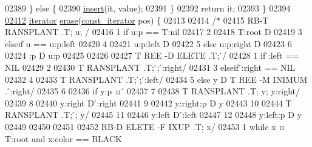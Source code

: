 \begin{DoxyCode}
02389                 \} \textcolor{keywordflow}{else} \{
02390                     \hyperlink{classaed2_1_1iterator_ab9446668ad5619115b6c4a10eac83d68_ab9446668ad5619115b6c4a10eac83d68}{insert}(it, value);
02391                 \}
02392                 \textcolor{keywordflow}{return} it;
02393             \}
02394 
\hyperlink{classaed2_1_1iterator_adf371aaec9e68bd4a4d5a889d0b6b679_adf371aaec9e68bd4a4d5a889d0b6b679}{02412}             \hyperlink{classaed2_1_1iterator_1_1iterator}{iterator} \hyperlink{classaed2_1_1iterator_adf371aaec9e68bd4a4d5a889d0b6b679_adf371aaec9e68bd4a4d5a889d0b6b679}{erase}(\hyperlink{classaed2_1_1iterator_1_1const__iterator}{const\_iterator} pos) \{
02413 
02414                 \textcolor{comment}{/*}
02415 \textcolor{comment}{                RB-T RANSPLANT .T; u; /}
02416 \textcolor{comment}{        1 if u:p == T:nil}
02417 \textcolor{comment}{        2}
02418 \textcolor{comment}{        T:root D}
02419 \textcolor{comment}{        3 elseif u == u:p:left}
02420 \textcolor{comment}{        4}
02421 \textcolor{comment}{        u:p:left D}
02422 \textcolor{comment}{        5 else u:p:right D}
02423 \textcolor{comment}{        6}
02424 \textcolor{comment}{        :p D u:p}
02425 \textcolor{comment}{}
02426 \textcolor{comment}{}
02427 \textcolor{comment}{        T REE -D ELETE .T;  ́/}
02428 \textcolor{comment}{        1 if  ́:left == NIL}
02429 \textcolor{comment}{        2}
02430 \textcolor{comment}{        T RANSPLANT .T;  ́;  ́:right/}
02431 \textcolor{comment}{        3 elseif  ́:right == NIL}
02432 \textcolor{comment}{        4}
02433 \textcolor{comment}{        T RANSPLANT .T;  ́;  ́:left/}
02434 \textcolor{comment}{        5 else y D T REE -M INIMUM . ́:right/}
02435 \textcolor{comment}{        6}
02436 \textcolor{comment}{        if y:p ¤  ́}
02437 \textcolor{comment}{        7}
02438 \textcolor{comment}{        T RANSPLANT .T; y; y:right/}
02439 \textcolor{comment}{        8}
02440 \textcolor{comment}{        y:right D  ́:right}
02441 \textcolor{comment}{        9}
02442 \textcolor{comment}{        y:right:p D y}
02443 \textcolor{comment}{        10}
02444 \textcolor{comment}{        T RANSPLANT .T;  ́; y/}
02445 \textcolor{comment}{        11}
02446 \textcolor{comment}{        y:left D  ́:left}
02447 \textcolor{comment}{        12}
02448 \textcolor{comment}{        y:left:p D y}
02449 \textcolor{comment}{}
02450 \textcolor{comment}{}
02451 \textcolor{comment}{}
02452 \textcolor{comment}{        RB-D ELETE -F IXUP .T; x/}
02453 \textcolor{comment}{        1 while x ¤ T:root and x:color == BLACK}

\end{DoxyCode}
